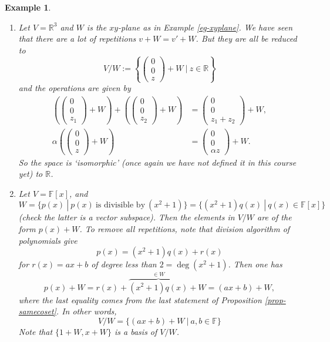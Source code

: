 \documentclass[12pt]{amsbook}
\newtheorem{example}[theorem]{Example}
\begin{document}
\begin{example} \
\begin{enumerate}
    \item Let $V = \mathbb{R}^3$ and $W$ is the $xy$-plane as in Example \ref{eg-xyplane}. We have seen that there are a lot of repetitions $v + W = v' + W$. But they are all be reduced to
    $$V/W := \left\{ \begin{pmatrix} 0 \\ 0 \\ z \end{pmatrix} + W\ |\ z \in \mathbb{R}\right\}$$
    and the operations are given by 
    \begin{align*} 
    \left(\begin{pmatrix} 0 \\ 0 \\ z_1 \end{pmatrix} + W\right) + \left(\begin{pmatrix} 0 \\ 0 \\ z_2 \end{pmatrix} + W\right) &= \begin{pmatrix} 0 \\ 0 \\ z_1+z_2 \end{pmatrix} + W,\\ \alpha\left(\begin{pmatrix} 0 \\ 0 \\ z \end{pmatrix} + W\right) &= \begin{pmatrix} 0 \\ 0 \\ \alpha z \end{pmatrix} + W.
    \end{align*}
    So the space is `isomorphic' (once again we have not defined it in this course yet) to $\mathbb{R}$.

    \item     Let $V = \mathbb{F}[x]$, and $W = \{p(x)\ |\ p(x)\ \text{is divisible by}\ (x^2+1)\} = \{(x^2+1)q(x)\ |\ q(x) \in \mathbb{F}[x]\}$ (check the latter is a vector subspace). Then the elements in $V/W$ are of the form
    $p(x) + W$. To remove all repetitions, note that division algorithm of polynomials give
    $$p(x) = (x^2+1)q(x) + r(x)$$
    for $r(x) = ax+b$ of degree less than $2 = \deg(x^2+1)$. Then one has
    $$p(x) +W = r(x) + \overbrace{(x^2+1)q(x)}^{\in W} + W = (ax+b) + W,$$
    where the last equality comes from the last statement of Proposition \ref{prop-samecoset}. In other words,
    $$V/W = \{(ax+b) + W\ |\ a, b \in \mathbb{F}\}$$
    Note that $\{1 + W, x + W\}$ is a basis of $V/W$.


\end{enumerate}
\end{example}
\end{document}

